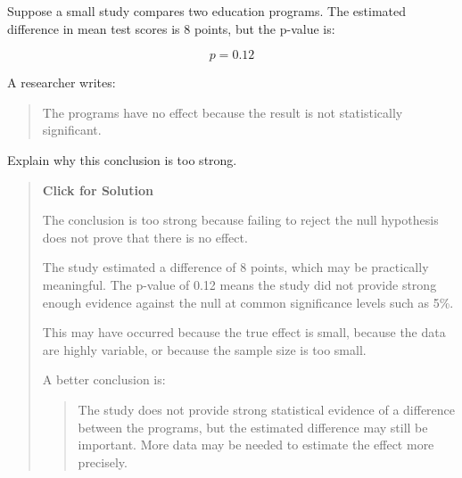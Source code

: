 \documentclass[
  letterpaper,
  DIV=11,
  numbers=noendperiod]{scrreprt}
\begin{document}
\begin{tcolorbox}[enhanced jigsaw, arc=.35mm, bottomrule=.15mm, bottomtitle=1mm, breakable, colback=white, colbacktitle=quarto-callout-note-color!10!white, colframe=quarto-callout-note-color-frame, coltitle=black, left=2mm, leftrule=.75mm, opacityback=0, opacitybacktitle=0.6, rightrule=.15mm, title=\textcolor{quarto-callout-note-color}{\faInfo}\hspace{0.5em}{Question 7}, titlerule=0mm, toprule=.15mm, toptitle=1mm]

Suppose a small study compares two education programs. The estimated
difference in mean test scores is 8 points, but the p-value is:

\[
p = 0.12
\]

A researcher writes:

\begin{quote}
The programs have no effect because the result is not statistically
significant.
\end{quote}

Explain why this conclusion is too strong.

\begin{quote}
\textbf{Click for Solution}

The conclusion is too strong because failing to reject the null
hypothesis does not prove that there is no effect.

The study estimated a difference of 8 points, which may be practically
meaningful. The p-value of 0.12 means the study did not provide strong
enough evidence against the null at common significance levels such as
5\%.

This may have occurred because the true effect is small, because the
data are highly variable, or because the sample size is too small.

A better conclusion is:

\begin{quote}
The study does not provide strong statistical evidence of a difference
between the programs, but the estimated difference may still be
important. More data may be needed to estimate the effect more
precisely.
\end{quote}
\end{quote}

\end{tcolorbox}
\end{document}
